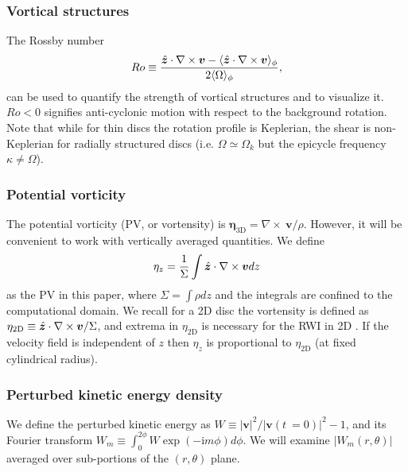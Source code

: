\subsubsection{Vortical structures}
The Rossby number
\begin{align}
  Ro \equiv
  \frac{\hat{\bm{z}}\cdot\nabla\times\bm{v}-\langle \hat{\bm{z}}\cdot\nabla\times\bm{v} \rangle_\phi}{2\langle \Omega \rangle_\phi},   
\end{align} 
can be used to quantify the strength of vortical structures and to
visualize it. $Ro<0$ signifies anti-cyclonic motion with respect to
the background rotation. Note that while for thin discs 
the rotation profile is Keplerian, the shear is non-Keplerian for radially  
structured discs (i.e. $\Omega\simeq\Omega_k$ but the epicycle
frequency $\kappa\neq\Omega$). 

\subsubsection{Potential vorticity}
The potential vorticity (PV, or vortensity) is 
$  \bm{\eta}_\mathrm{3D} = \nabla\times~\bm{v}/\rho$. 
However, it will be convenient to work with vertically averaged
quantities. We define  
\begin{align}
  \eta_z = \frac{1}{\Sigma}\int \hat{\bm{z}}\cdot\nabla\times\bm{v} dz
\end{align}
as the PV in this paper, where $\Sigma = \int\rho dz$ and the
integrals are confined to the computational domain. 
We recall for a 2D disc the vortensity is defined as 
$\eta_\mathrm{2D} \equiv \hat{\bm{z}}\cdot\nabla\times\bm{v}/\Sigma$, and
extrema in $\eta_\mathrm{2D}$ is necessary for the RWI in
2D \citep{lovelace99,lin10}. If the velocity field is independent of 
$z$ then $\eta_z$ is proportional to $\eta_\mathrm{2D}$ (at fixed
cylindrical radius).    

\subsubsection{Perturbed kinetic energy density}  
We define the perturbed kinetic energy as
$W\equiv|\bm{v}|^2/|\bm{v}(t~=0)|^2 - 1$, and its Fourier transform 
$W_m\equiv\int_0^{2\phi} W\exp{(-\mathrm{i}m\phi)}d\phi$. We will examine
$|W_m(r,\theta)|$ averaged over sub-portions of the $(r,\theta)$
plane. 
